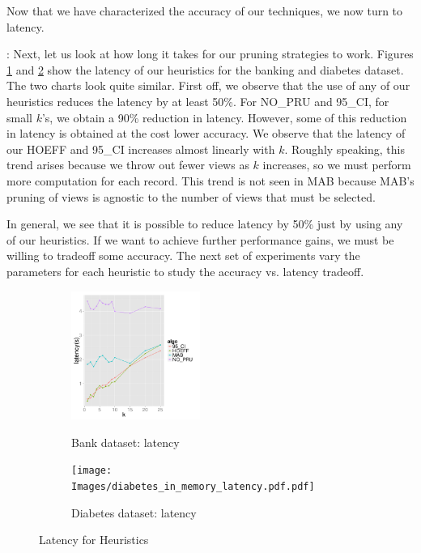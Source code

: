 Now that we have characterized the accuracy of our techniques, we now turn to
latency.

:
Next, let us look at how long it takes for our pruning strategies to work.
Figures \ref{fig:bank_latency} and \ref{fig:diabetes_latency} show the latency
of our heuristics for the banking and diabetes dataset.
The two charts look quite similar.
First off, we observe that the use of any of our heuristics reduces the latency
by at least 50\%.
For NO\_PRU and 95\_CI, for small $k$'s, we obtain a 90\% reduction in
latency. However, some of this reduction in latency is obtained at the cost
lower accuracy.
We observe that the latency of our HOEFF and 95\_CI increases almost linearly
with $k$.
Roughly speaking, this trend arises because we throw out fewer views as $k$
increases, so we must perform more computation for each record.
This trend is not seen in MAB because MAB's pruning of views is agnostic to
the number of views that must be selected.

In general, we see that it is possible to reduce latency by 50\% just by using
any of our heuristics.
If we want to achieve further performance gains, we must be willing to
tradeoff some accuracy.
The next set of experiments vary the parameters for each heuristic to study
the accuracy vs. latency tradeoff.\\

\begin{figure}[h]
\centering
\begin{subfigure}{0.49\linewidth}
\centering
{\includegraphics[width=4.2cm] {Images/bank_in_memory_latency.pdf}}
\caption{Bank dataset: latency}
\label{fig:bank_latency}
\end{subfigure}
\begin{subfigure}{0.49\linewidth}
\centering
{\texttt{[image: Images/diabetes\_in\_memory\_latency.pdf.pdf]}}
\caption{Diabetes dataset: latency}
\label{fig:diabetes_latency}
\end{subfigure}
\label{fig:accuracy}
\caption{Latency for Heuristics}
\end{figure}

